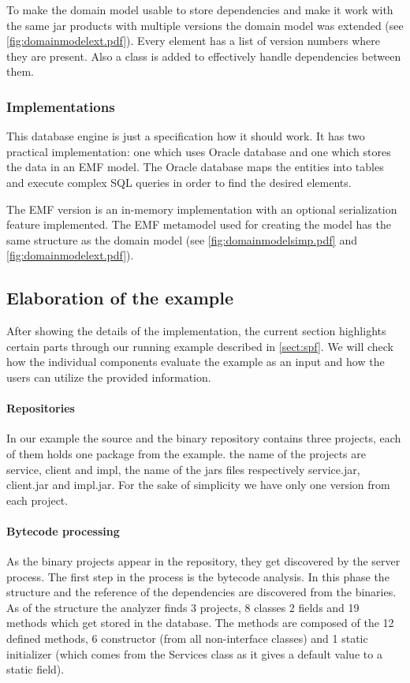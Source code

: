 To make the domain model usable to store dependencies and make it work with the
same jar products with multiple versions the domain model was extended (see
\autoref{fig:domainmodelext.pdf}).  Every element has a list of version numbers where they are
present. Also a  class is added to effectively handle
dependencies between them.

\subsubsection{Implementations}
This database engine is just a specification how it should work. It has two
practical implementation: one which uses Oracle database and one which stores
the data in an EMF model. The Oracle database maps the entities into tables and
execute complex SQL queries in order to find the desired elements.

The EMF version is an in-memory implementation with an optional serialization
feature implemented. The EMF metamodel used for creating the model has the same
structure as the domain model (see \autoref{fig:domainmodelsimp.pdf} and
\autoref{fig:domainmodelext.pdf}).



\subsection{Elaboration of the example}\label{sect:elabex1}
After showing the details of the implementation, the current section highlights
certain parts through our running example described in \autoref{sect:spf}.
We will check how the individual components evaluate the example as an input and
how the users can utilize the provided information.

\paragraph{Repositories}
In our example the source and the binary
repository contains three projects, each of them holds one package from the
example. the name of the projects are service, client and impl, the name of 
the jars files respectively service.jar, client.jar and impl.jar. For the sake
of simplicity we have only one version from each project. 

\paragraph{Bytecode processing}
As 
the binary projects appear in the repository, they get discovered by the 
server process. 
The first step in the process is the bytecode analysis. In this phase the
structure and the reference of the dependencies are discovered from the
binaries. As of the structure the analyzer finds 3 projects, 8 classes 2 fields
and 19 methods which get stored in the database.
The methods are composed of the 12 defined methods, 6 constructor (from all
non-interface classes) and 1 static initializer (which comes from the Services
class as it gives a default value to a static field).

